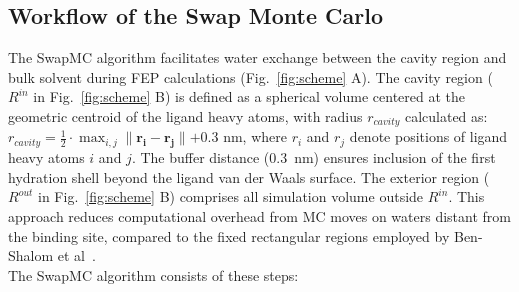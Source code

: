 \documentclass[journal=jacsat,manuscript=article]{achemso}
\begin{document}
\subsection{Workflow of the Swap Monte Carlo}
The SwapMC algorithm facilitates water exchange between the cavity region and bulk solvent during FEP calculations (Fig.~\ref{fig:scheme} A).
The cavity region ($R^{in}$ in Fig.~\ref{fig:scheme} B) is defined as a spherical volume centered at the geometric centroid of the ligand heavy atoms, with radius $r_{cavity}$ calculated as: $r_{cavity} = \frac{1}{2} \cdot \max_{i,j} \parallel \mathbf{r_i} - \mathbf{r_j} \parallel + 0.3 \text{~nm}$,
where $r_i$ and $r_j$ denote positions of ligand heavy atoms $i$ and $j$. 
The buffer distance (0.3~nm) ensures inclusion of the first hydration shell beyond the ligand van der Waals surface. 
The exterior region ($R^{out}$ in Fig.~\ref{fig:scheme} B) comprises all simulation volume outside $R^{in}$.
This approach reduces computational overhead from MC moves on waters distant from the binding site, compared to the fixed rectangular regions employed by Ben-Shalom et al~\cite{ben2021fast}. \\
\newline
The SwapMC algorithm consists of these steps:
\end{document}
